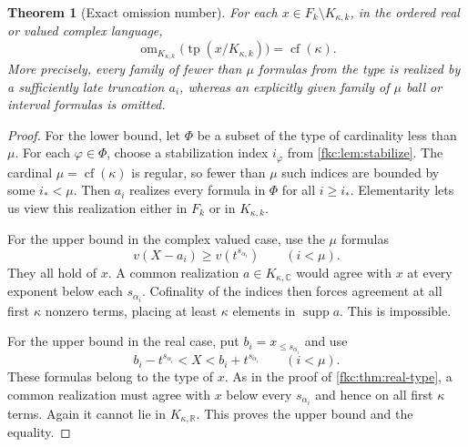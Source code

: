 \documentclass[11pt,letterpaper]{article}
\numberwithin{equation}{section}
\newtheorem{theorem}{Theorem}[section]
\theoremstyle{definition}
\theoremstyle{remark}
\newcommand{\R}{\mathbb R}
\newcommand{\C}{\mathbb C}
\newcommand{\supp}{\operatorname{supp}}
\newcommand{\cf}{\operatorname{cf}}
\newcommand{\tp}{\operatorname{tp}}
\newcommand{\om}{\operatorname{om}}
\newcommand{\K}{K_{\kappa,k}}
\newcommand{\KR}{K_{\kappa,\R}}
\newcommand{\KC}{K_{\kappa,\C}}
\begin{document}
\begin{theorem}[Exact omission number]\label{fkc:thm:omission}
For each $x\in F_k\setminus\K$, in the ordered real or valued complex language,
\begin{equation}\label{fkc:eq:om-main}
 \boxed{\ \om_{\K}\bigl(\tp(x/\K)\bigr)=\cf(\kappa).\ }
\end{equation}
More precisely, every family of fewer than $\mu$ formulas from the type is realized by a sufficiently late truncation $a_i$, whereas an explicitly given family of $\mu$ ball or interval formulas is omitted.
\end{theorem}
\begin{proof}
For the lower bound, let $\Phi$ be a subset of the type of cardinality less than $\mu$. For each $\varphi\in\Phi$, choose a stabilization index $i_\varphi$ from \cref{fkc:lem:stabilize}. The cardinal $\mu=\cf(\kappa)$ is regular, so fewer than $\mu$ such indices are bounded by some $i_*<\mu$. Then $a_i$ realizes every formula in $\Phi$ for all $i\ge i_*$. Elementarity lets us view this realization either in $F_k$ or in $\K$.

For the upper bound in the complex valued case, use the $\mu$ formulas
\begin{equation}\label{fkc:eq:om-ball}
 v(X-a_i)\ge v(t^{s_{\alpha_i}})\qquad(i<\mu).
\end{equation}
They all hold of $x$. A common realization $a\in\KC$ would agree with $x$ at every exponent below each $s_{\alpha_i}$. Cofinality of the indices then forces agreement at all first $\kappa$ nonzero terms, placing at least $\kappa$ elements in $\supp a$. This is impossible.

For the upper bound in the real case, put $b_i=x_{\le s_{\alpha_i}}$ and use
\begin{equation}\label{fkc:eq:om-interval}
 b_i-t^{s_{\alpha_i}}<X<b_i+t^{s_{\alpha_i}}\qquad(i<\mu).
\end{equation}
These formulas belong to the type of $x$. As in the proof of \cref{fkc:thm:real-type}, a common realization must agree with $x$ below every $s_{\alpha_i}$ and hence on all first $\kappa$ terms. Again it cannot lie in $\KR$. This proves the upper bound and the equality.
\end{proof}
\end{document}
